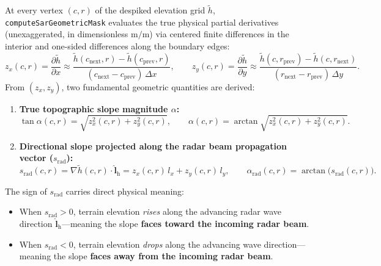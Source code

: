 \documentclass[11pt,a4paper]{article}
\newcommand{\unit}[1]{\mathrm{#1}}
\begin{document}
At every vertex $(c,r)$ of the despiked elevation grid $\tilde{h}$, \texttt{computeSarGeometricMask} evaluates the true physical partial derivatives (unexaggerated, in dimensionless $\unit{m/m}$) via centered finite differences in the interior and one-sided differences along the boundary edges:
\begin{equation}
  z_x(c,r) = \frac{\partial \tilde{h}}{\partial x}
  \approx \frac{\tilde{h}(c_{\mathrm{next}},r) - \tilde{h}(c_{\mathrm{prev}},r)}{(c_{\mathrm{next}} - c_{\mathrm{prev}})\,\Delta x},
  \qquad
  z_y(c,r) = \frac{\partial \tilde{h}}{\partial y}
  \approx \frac{\tilde{h}(c,r_{\mathrm{prev}}) - \tilde{h}(c,r_{\mathrm{next}})}{(r_{\mathrm{next}} - r_{\mathrm{prev}})\,\Delta y}.
  \label{eq:derivadas-reales-sar}
\end{equation}
From $(z_x, z_y)$, two fundamental geometric quantities are derived:
\begin{enumerate}
  \item \textbf{True topographic slope magnitude $\alpha$:}
        \begin{equation}
          \tan\alpha(c,r) = \sqrt{z_x^2(c,r) + z_y^2(c,r)},
          \qquad
          \alpha(c,r) = \arctan\sqrt{z_x^2(c,r) + z_y^2(c,r)}.
          \label{eq:pendiente-real}
        \end{equation}
  \item \textbf{Directional slope projected along the radar beam propagation vector ($s_{\mathrm{rad}}$):}
        \begin{equation}
          s_{\mathrm{rad}}(c,r) = \nabla\tilde{h}(c,r)\cdot\hat{\mathbf{l}}_{\mathrm{h}}
          = z_x(c,r)\,l_x + z_y(c,r)\,l_y,
          \qquad
          \alpha_{\mathrm{rad}}(c,r) = \arctan\bigl(s_{\mathrm{rad}}(c,r)\bigr).
          \label{eq:pendiente-proyectada}
        \end{equation}
\end{enumerate}

The sign of $s_{\mathrm{rad}}$ carries direct physical meaning:
\begin{itemize}
  \item When $s_{\mathrm{rad}} > 0$, terrain elevation \emph{rises} along the advancing radar wave direction $\hat{\mathbf{l}}_{\mathrm{h}}$---meaning the slope \textbf{faces toward the incoming radar beam}.
  \item When $s_{\mathrm{rad}} < 0$, terrain elevation \emph{drops} along the advancing wave direction---meaning the slope \textbf{faces away from the incoming radar beam}.
\end{itemize}
\end{document}
